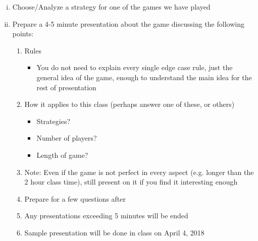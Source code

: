 \documentclass[12 pt]{article}
\begin{document}
\begin{enumerate}[(i)]
\item Choose/Analyze a strategy for one of the games we have played
\item Prepare a 4-5 minute presentation about the game discussing the following points:
\begin{enumerate}[(1)]
\item Rules
	\begin{itemize}
	\item You do not need to explain every single edge case rule, just the general idea of the game, enough to understand the main idea for the rest of presentation
	\end{itemize}
\item How it applies to this class (perhaps answer one of these, or others)
	\begin{itemize}
	\item Strategies?
	\item Number of players?
	\item Length of game?
	\end{itemize}
\item Note: Even if the game is not perfect in every aspect (e.g. longer than the 2 hour class time), still present on it if you find it interesting enough
\item Prepare for a few questions after
\item Any presentations exceeding 5 minutes will be ended
\item Sample presentation will be done in class on April 4, 2018
\end{enumerate}
\end{enumerate}
\end{document}
